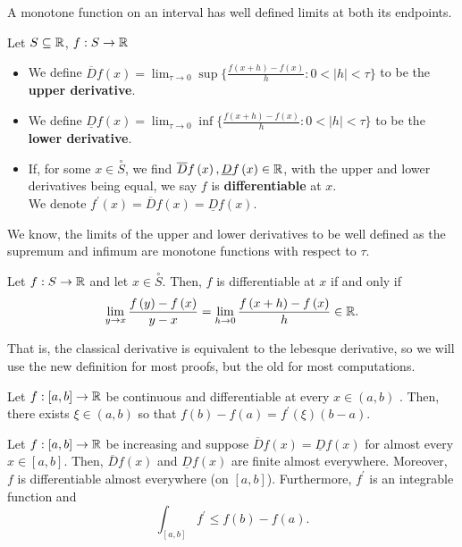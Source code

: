 \begin{recall}
A monotone function on an interval has well defined limits at both its endpoints.
\end{recall}

\begin{definition}
Let \(S \subseteq \mathbb{R}\), \(f: S \to \mathbb{R}\)
\begin{itemize}
	\item We define \(\overline{D}f\left( x \right) = \lim_{\tau \to 0}\sup \{ \frac{f\left( x+h \right) - f\left( x \right) }{h} : 0 < \left| h \right| < \tau \} \) to be the \textbf{upper derivative}.
	\item We define \(\underline{D} f\left( x \right) = \lim_{\tau \to 0} \inf \{ \frac{f\left( x+h \right) - f\left( x \right) }{h} : 0 < \left| h \right| < \tau \} \) to be the \textbf{lower derivative}.
	\item If, for some \(x \in \overset{\circ}{S}\), we find \(\overline{D}f\left( x \right) , \underline{D}f\left( x \right) \in \mathbb{R}\), with the upper and lower derivatives being equal, we say \(f\) is \textbf{differentiable} at \(x\).\\
		We denote \(f^{\prime}\left( x \right) = \overline{D}f\left( x \right) = \underline{D}f\left( x \right) \).
\end{itemize}
\end{definition}
We know, the limits of the upper and lower derivatives to be well defined as the supremum and infimum are monotone functions with respect to \(\tau\).
\begin{proposition}
	Let \(f: S \to \mathbb{R}\) and let \(x \in \overset{\circ}{S}\). Then, \(f\) is differentiable at \(x\) if and only if \[
		\lim_{y \to x} \frac{f\left( y \right)  - f\left( x \right) }{y-x} = \lim_{h \to 0}\frac{f\left( x+h \right) - f\left( x \right) }{h} \in \R
.	\]
\end{proposition}
That is, the classical derivative is equivalent to the lebesque derivative, so we will use the new definition for most proofs, but the old for most computations.
\begin{theorem}
	Let \(f: \left[ a, b \right]  \to \mathbb{R}\) be continuous and differentiable at every \(x \in \left( a, b \right) \) . Then, there exists \(\xi \in \left( a, b \right) \) so that \(f\left( b \right) - f\left( a \right)  = f^{\prime}\left( \xi \right) \left( b-a \right) \).
\end{theorem}
\begin{lemma}
	Let \(f: \left[ a, b \right]  \to \mathbb{R}\) be increasing and suppose \(\overline{D}f\left( x \right) = \underline{D}f\left( x \right) \) for almost every \(x \in \left[ a, b \right] \). Then, \(\overline{D}f\left( x \right) \) and \(\underline{D}f\left( x \right) \) are finite almost everywhere. Moreover, \(f \) is differentiable almost everywhere (on \(\left[ a, b \right] \)). Furthermore, \(f^{\prime}\) is an integrable function and \[
		\int_{\left[ a,b  \right] } f^{\prime} \le f\left( b \right) - f\left( a \right)
	.\]
\end{lemma}
